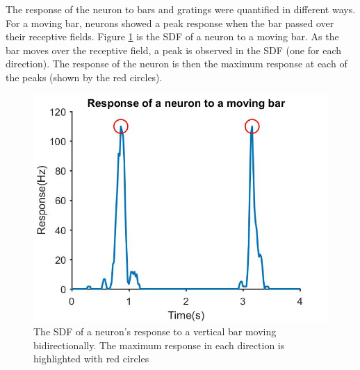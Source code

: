 	The response of the neuron to bars and gratings were quantified in different ways. For a moving bar, neurons showed a peak response when the bar passed over their receptive fields. Figure \ref{fig:mb} is the SDF of a neuron to a moving bar. As the bar moves over the receptive field, a peak is observed in the SDF (one for each direction). The response of the neuron is then the maximum response at each of the peaks (shown by the red circles).
		\begin{figure}[H]
		
		\includegraphics[width=\linewidth]{methods/SDF_movingbar.jpg}
		\caption{The SDF of a neuron’s response to a vertical bar moving bidirectionally. The maximum response in each direction is highlighted with red circles}
		\label{fig:mb}
		\end{figure}

